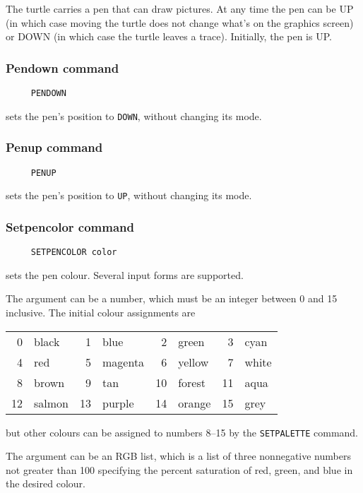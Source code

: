 The turtle carries a pen that can draw pictures.  At any time the pen
can be UP (in which case moving the turtle does not change what's on the
graphics screen) or DOWN (in which case the turtle leaves a trace).
Initially, the pen is UP.

\subsubsection*{Pendown command}
\begin{verbatim}
     PENDOWN
\end{verbatim}
sets the pen's position to \texttt{DOWN}, without changing its mode.

\subsubsection*{Penup command}
\begin{verbatim}
     PENUP
\end{verbatim}
sets the pen's position to \texttt{UP}, without changing its mode.

\subsubsection*{Setpencolor command}
\begin{verbatim}
     SETPENCOLOR color
\end{verbatim}
\label{logoturtle:setpencolor}
sets the pen colour.  Several input forms are supported.

The argument can be a number, which must be an integer between 0 and
15 inclusive.  The initial colour assignments are
\begin{center}
  \begin{tabular}{rlrlrlrl}
    0 & black  &  1 & blue    &  2 & green  &  3 & cyan  \\
    4 & red    &  5 & magenta &  6 & yellow &  7 & white \\
    8 & brown  &  9 & tan     & 10 & forest & 11 & aqua  \\
    12 & salmon & 13 & purple  & 14 & orange & 15 & grey
  \end{tabular}
\end{center}
but other colours can be assigned to numbers 8--15 by the
\texttt{SETPALETTE} command.

The argument can be an RGB list, which is a list of three nonnegative
numbers not greater than 100 specifying the percent saturation of red,
green, and blue in the desired colour.

